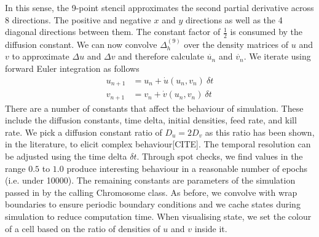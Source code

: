 In this sense, the 9-point stencil approximates the second partial derivative across 8 directions. The positive and negative $x$ and $y$ directions as well as the 4 diagonal directions between them. The constant factor of $\frac{1}{2}$ is consumed by the diffusion constant. We can now convolve $\Delta^{(9)}_h$ over the density matrices of $u$ and $v$ to approximate $\Delta u$ and $\Delta v$ and therefore calculate $\dot{u_n}$ and $\dot{v_n}$. We iterate using forward Euler integration as follows
\begin{align*}
    u_{n+1} &= u_n + \dot{u}(u_n, v_n)\ \delta t\\
    v_{n+1} &= v_n + \dot{v}(u_n, v_n)\ \delta t
\end{align*}
There are a number of constants that affect the behaviour of simulation. These include the diffusion constants, time delta, initial densities, feed rate, and kill rate. We pick a diffusion constant ratio of $D_u = 2D_v$ as this ratio has been shown, in the literature, to elicit complex behaviour[CITE]. The temporal resolution can be adjusted using the time delta $\delta t$. Through spot checks, we find values in the range $0.5$ to $1.0$ produce interesting behaviour in a reasonable number of epochs (i.e. under 10000). The remaining constants are parameters of the simulation passed in by the calling Chromosome class. As before, we convolve with wrap boundaries to ensure periodic boundary conditions and we cache states during simulation to reduce computation time. When visualising state, we set the colour of a cell based on the ratio of densities of $u$ and $v$ inside it.\\


